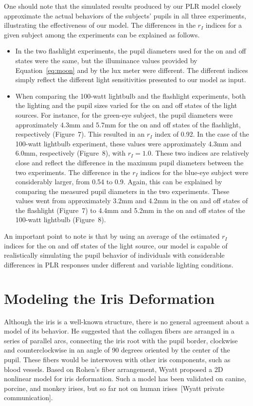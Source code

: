 \documentclass{acmtog} %
\begin{document}
One should note that the simulated results produced by our PLR model
closely approximate the actual behaviors of the subjects' pupils in all
three experiments, illustrating the effectiveness of our model. The
differences in the $r_I$ indices for a given subject among the
experiments can be explained as follows.
\begin{itemize}
\item In the two flashlight experiments, the pupil diameters used for
the {on} and {off} states were the same, but the illuminance values
provided by Equation~\ref{eq:moon} and by the lux meter were different.
The different indices simply reflect the different light sensitivities
presented to our model as input.
\item When comparing the 100-watt lightbulb and the flashlight
experiments, both the lighting and the pupil sizes varied for the {on}
and {off} states of the light sources. For instance, for the green-eye
subject, the pupil diameters were approximately 4.3mm and 5.7mm for the
{on} and {off} states of the flashlight, respectively (Figure~7). This
resulted in an $r_I$ index of 0.92. In the case of the 100-watt
lightbulb experiment, these values were approximately 4.3mm and 6.0mm,
respectively (Figure~8), with $r_I = 1.0$. These two indices are
relatively close and reflect the difference in the maximum pupil
diameters between the two experiments. The difference in the $r_I$
indices for the blue-eye subject were considerably larger, from 0.54 to
0.9. Again, this can be explained by comparing the measured pupil
diameters in the two experiments. These values went from approximately
3.2mm and 4.2mm in the {on} and {off} states of the flashlight
(Figure~7) to 4.4mm and 5.2mm in the {on} and {off} states of the
100-watt lightbulb (Figure~8).
\end{itemize}
An important point to note is that by using an average of the estimated
$r_I$ indices for the {on} and {off} states of the light source, our
model is capable of realistically simulating the pupil behavior of
individuals with considerable differences in PLR responses under
different and variable lighting conditions.

\section{Modeling the Iris Deformation}
\label{sec:patterndeformations}

Although the iris is a well-known structure, there is no general
agreement about a model of its behavior. He suggested that the collagen
fibers are arranged in a series of parallel arcs, connecting the iris
root with the pupil border, clockwise and counterclockwise in an angle
of 90 degrees oriented by the center of the pupil. These fibers would be
interwoven with other iris components, such as blood vessels. Based on
Rohen's fiber arrangement, Wyatt proposed a 2D nonlinear model for iris
deformation. Such a model has been validated on canine, porcine, and
monkey irises, but so far not on human irises~[Wyatt private
communication].
\end{document}
